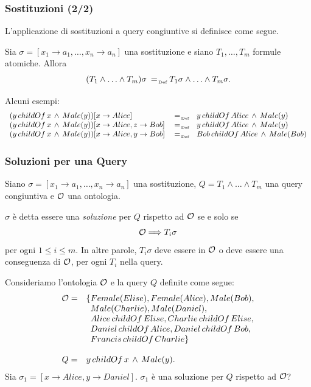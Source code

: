 \documentclass[8pt]{beamer}
\begin{document}
\begin{frame}
\frametitle{Sostituzioni (2/2)}

L'applicazione di sostituzioni a query congiuntive si definisce come segue.
\vspace{\baselineskip}

Sia $\sigma=[x_1 \rightarrow a_1, \ldots, x_n \rightarrow a_n]$ una sostituzione
e siano $T_1, \ldots, T_m$ formule atomiche. Allora
\[
 (T_1 \wedge \ldots \wedge T_m)\sigma \defAs T_1\sigma \wedge \ldots \wedge T_m\sigma . 
\]
\vspace{\baselineskip}

Alcuni esempi:
\[
 \begin{array}{lcl}
 (y\,childOf\,x\,\wedge\,Male(y))[x \rightarrow Alice] & \defAs & y\,childOf\,Alice\,\wedge\,Male(y)  \\
 (y\,childOf\,x\,\wedge\,Male(y))[x \rightarrow Alice, z \rightarrow Bob] & \defAs & y\,childOf\,Alice\,\wedge\,Male(y)  \\
 (y\,childOf\,x\,\wedge\,Male(y))[x \rightarrow Alice, y \rightarrow Bob] & \defAs & Bob\,childOf\,Alice\,\wedge\,Male(Bob)  \\
 \end{array}
\]
\end{frame}

\begin{frame}
\frametitle{Soluzioni per una Query}
Siano $\sigma=[x_1 \rightarrow a_1, \ldots, x_n \rightarrow a_n]$ una sostituzione,
$Q=T_1 \wedge \ldots \wedge T_m$ una query congiuntiva e $\mathcal{O}$ una ontologia.
\vspace{\baselineskip}

$\sigma$ \`e detta essere una \emph{soluzione} per $Q$ rispetto ad $\mathcal{O}$ se
e solo se 
\[
	\mathcal{O} \Longrightarrow T_i\sigma
\]
per ogni $1\leq i\leq m$. In altre parole, $T_i\sigma$ deve essere in $\mathcal{O}$ o
deve essere una conseguenza di $\mathcal{O}$, per ogni $T_i$ nella query.
\vspace{\baselineskip}

Consideriamo l'ontologia $\mathcal{O}$ e la query $Q$ definite come segue:
\[
\begin{array}{cl}
  \Ont  =  &  \{Female(Elise), Female(Alice), Male(Bob), \\
  &\phantom{\{}Male(Charlie), Male(Daniel), \\
  &\phantom{\{}Alice\,childOf\,Elise, Charlie\,childOf\,Elise, \\
  &\phantom{\{}Daniel\,childOf\,Alice, Daniel\,childOf\,Bob, \\
  &\phantom{\{}Francis\,childOf\,Charlie \}\\
  &\\
  Q = & y\,childOf\,x\,\wedge\,Male(y) .
 \end{array}
\]
Sia $\sigma_1=[x \rightarrow Alice, y \rightarrow Daniel]$. $\sigma_1$ \`e una soluzione per $Q$
rispetto ad $\mathcal{O}$?
\end{frame}
\end{document}
